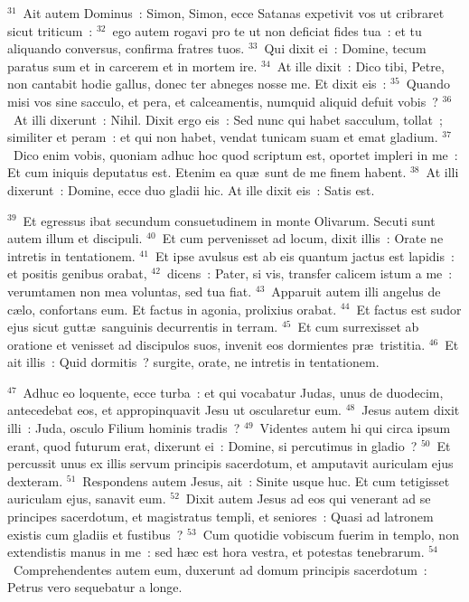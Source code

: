 ${}^{31}$~Ait autem Dominus~: Simon, Simon, ecce Satanas expetivit vos ut cribraret sicut triticum~:
${}^{32}$~ego autem rogavi pro te ut non deficiat fides tua~: et tu aliquando conversus, confirma fratres tuos.
${}^{33}$~Qui dixit ei~: Domine, tecum paratus sum et in carcerem et in mortem ire.
${}^{34}$~At ille dixit~: Dico tibi, Petre, non cantabit hodie gallus, donec ter abneges nosse me. Et dixit eis~:
${}^{35}$~Quando misi vos sine sacculo, et pera, et calceamentis, numquid aliquid defuit vobis~?
${}^{36}$~At illi dixerunt~: Nihil. Dixit ergo eis~: Sed nunc qui habet sacculum, tollat~; similiter et peram~: et qui non habet, vendat tunicam suam et emat gladium.
${}^{37}$~Dico enim vobis, quoniam adhuc hoc quod scriptum est, oportet impleri in me~: Et cum iniquis deputatus est. Etenim ea qu\ae\ sunt de me finem habent.
${}^{38}$~At illi dixerunt~: Domine, ecce duo gladii hic. At ille dixit eis~: Satis est.


${}^{39}$~Et egressus ibat secundum consuetudinem in monte Olivarum. Secuti sunt autem illum et discipuli.
${}^{40}$~Et cum pervenisset ad locum, dixit illis~: Orate ne intretis in tentationem.
${}^{41}$~Et ipse avulsus est ab eis quantum jactus est lapidis~: et positis genibus orabat,
${}^{42}$~dicens~: Pater, si vis, transfer calicem istum a me~: verumtamen non mea voluntas, sed tua fiat.
${}^{43}$~Apparuit autem illi angelus de c\ae lo, confortans eum. Et factus in agonia, prolixius orabat.
${}^{44}$~Et factus est sudor ejus sicut gutt\ae\ sanguinis decurrentis in terram.
${}^{45}$~Et cum surrexisset ab oratione et venisset ad discipulos suos, invenit eos dormientes pr\ae\ tristitia.
${}^{46}$~Et ait illis~: Quid dormitis~? surgite, orate, ne intretis in tentationem.


${}^{47}$~Adhuc eo loquente, ecce turba~: et qui vocabatur Judas, unus de duodecim, antecedebat eos, et appropinquavit Jesu ut oscularetur eum.
${}^{48}$~Jesus autem dixit illi~: Juda, osculo Filium hominis tradis~?
${}^{49}$~Videntes autem hi qui circa ipsum erant, quod futurum erat, dixerunt ei~: Domine, si percutimus in gladio~?
${}^{50}$~Et percussit unus ex illis servum principis sacerdotum, et amputavit auriculam ejus dexteram.
${}^{51}$~Respondens autem Jesus, ait~: Sinite usque huc. Et cum tetigisset auriculam ejus, sanavit eum.
${}^{52}$~Dixit autem Jesus ad eos qui venerant ad se principes sacerdotum, et magistratus templi, et seniores~: Quasi ad latronem existis cum gladiis et fustibus~?
${}^{53}$~Cum quotidie vobiscum fuerim in templo, non extendistis manus in me~: sed h\ae c est hora vestra, et potestas tenebrarum.
${}^{54}$~Comprehendentes autem eum, duxerunt ad domum principis sacerdotum~: Petrus vero sequebatur a longe.


